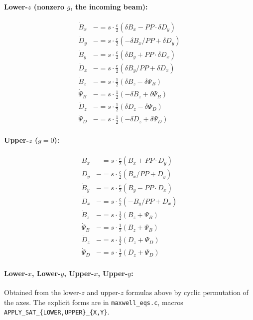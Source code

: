 \documentclass[11pt]{article}
\begin{document}
\paragraph{Lower-$z$ (nonzero $g$, the incoming beam):}
\begin{align*}
  \dot B_x   &\mathrel{-}= s \cdot \tfrac{c}{2} (\delta B_x - PP \cdot \delta D_y) \\
  \dot D_y   &\mathrel{-}= s \cdot \tfrac{c}{2} (-\delta B_x / PP + \delta D_y) \\
  \dot B_y   &\mathrel{-}= s \cdot \tfrac{c}{2} (\delta B_y + PP \cdot \delta D_x) \\
  \dot D_x   &\mathrel{-}= s \cdot \tfrac{c}{2} (\delta B_y / PP + \delta D_x) \\
  \dot B_z   &\mathrel{-}= s \cdot \tfrac{1}{2} (\delta B_z - \delta \Psi_B) \\
  \dot \Psi_B &\mathrel{-}= s \cdot \tfrac{1}{2} (-\delta B_z + \delta \Psi_B) \\
  \dot D_z   &\mathrel{-}= s \cdot \tfrac{1}{2} (\delta D_z - \delta \Psi_D) \\
  \dot \Psi_D &\mathrel{-}= s \cdot \tfrac{1}{2} (-\delta D_z + \delta \Psi_D)
\end{align*}

\paragraph{Upper-$z$ ($g = 0$):}
\begin{align*}
  \dot B_x   &\mathrel{-}= s \cdot \tfrac{c}{2} (B_x + PP \cdot D_y) \\
  \dot D_y   &\mathrel{-}= s \cdot \tfrac{c}{2} (B_x / PP + D_y) \\
  \dot B_y   &\mathrel{-}= s \cdot \tfrac{c}{2} (B_y - PP \cdot D_x) \\
  \dot D_x   &\mathrel{-}= s \cdot \tfrac{c}{2} (-B_y / PP + D_x) \\
  \dot B_z   &\mathrel{-}= s \cdot \tfrac{1}{2} (B_z + \Psi_B) \\
  \dot \Psi_B &\mathrel{-}= s \cdot \tfrac{1}{2} (B_z + \Psi_B) \\
  \dot D_z   &\mathrel{-}= s \cdot \tfrac{1}{2} (D_z + \Psi_D) \\
  \dot \Psi_D &\mathrel{-}= s \cdot \tfrac{1}{2} (D_z + \Psi_D)
\end{align*}

\paragraph{Lower-$x$, Lower-$y$, Upper-$x$, Upper-$y$:} Obtained from the
lower-$z$ and upper-$z$ formulas above by cyclic permutation of the axes.
The explicit forms are in \texttt{maxwell\_eqs.c}, macros
\texttt{APPLY\_SAT\_\{LOWER,UPPER\}\_\{X,Y\}}.
\end{document}
